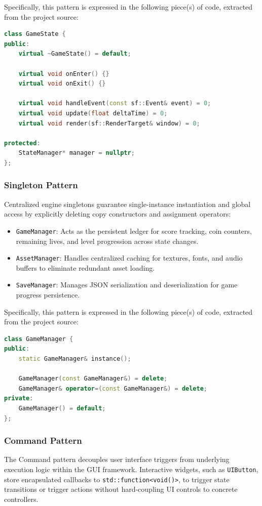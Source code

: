 \documentclass[12pt, a4paper]{article}
\begin{document}
Specifically, this pattern is expressed in the following piece(s) of code, extracted from the project source:

\begin{lstlisting}[language=C++]
class GameState {
public:
    virtual ~GameState() = default;

    virtual void onEnter() {}
    virtual void onExit() {}

    virtual void handleEvent(const sf::Event& event) = 0;
    virtual void update(float deltaTime) = 0;
    virtual void render(sf::RenderTarget& window) = 0;

protected:
    StateManager* manager = nullptr;
};
\end{lstlisting}

\subsubsection{Singleton Pattern}
Centralized engine singletons guarantee single-instance instantiation and global access by explicitly deleting copy constructors and assignment operators:
\begin{itemize}
\item \texttt{GameManager}: Acts as the persistent ledger for score tracking, coin counters, remaining lives, and level progression across state changes.
\item \texttt{AssetManager}: Handles centralized caching for textures, fonts, and audio buffers to eliminate redundant asset loading.
\item \texttt{SaveManager}: Manages JSON serialization and deserialization for game progress persistence.
\end{itemize}

Specifically, this pattern is expressed in the following piece(s) of code, extracted from the project source:

\begin{lstlisting}[language=C++]
class GameManager {
public:
    static GameManager& instance();

    GameManager(const GameManager&) = delete;
    GameManager& operator=(const GameManager&) = delete;
private:
    GameManager() = default;
};
\end{lstlisting}

\newpage

\subsubsection{Command Pattern}
The Command pattern decouples user interface triggers from underlying execution logic within the GUI framework. Interactive widgets, such as \texttt{UIButton}, store encapsulated callbacks to \texttt{std::function<void()>}, to trigger state transitions or trigger actions without hard-coupling UI controls to concrete controllers.
\end{document}
